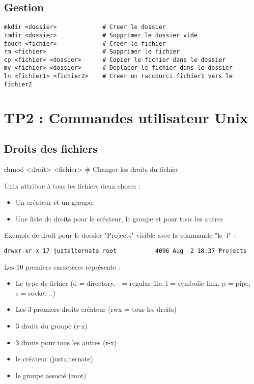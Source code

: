 \documentclass{article}
\begin{document}
\subsection{Gestion}
\begin{lstlisting}
mkdir <dossier>             # Creer le dossier
rmdir <dossier>             # Supprimer le dossier vide
touch <fichier>             # Creer le fichier
rm <fichier>                # Supprimer le fichier
cp <fichier> <dossier>      # Copier le fichier dans le dossier
mv <fichier> <dossier>      # Deplacer le fichier dans le dossier
ln <fichier1> <fichier2>    # Creer un raccourci fichier1 vers le fichier2 
\end{lstlisting}

\section{TP2 : Commandes utilisateur Unix}

\subsection{Droits des fichiers}

chmod <droit> <fichier>     # Changer les droits du fichier

Unix attribue à tous les fichiers deux choses :

\begin{itemize}
  \item Un créateur et un groupe.
  \item Une liste de droits pour le créateur, le groupe et pour tous les autres
\end{itemize}

Exemple de droit pour le dossier "Projects" visible avec la commande "ls -l" : 
\begin{lstlisting}
drwxr-xr-x 17 justalternate root           4096 Aug  2 18:37 Projects
\end{lstlisting}
Les 10 premiers caractères représente :
\begin{itemize}
  \item Le type de fichier (d = directory, - = regular file, l = symbolic link, p = pipe, s = socket ..)
  \item Les 3 premiers droits créateur (rwx = tous les droits)
  \item 3 droits du groupe (r-x)
  \item 3 droits pour tous les autres (r-x)
  \item le créateur (justalternate)
  \item le groupe associé (root)
\end{itemize}
\end{document}
